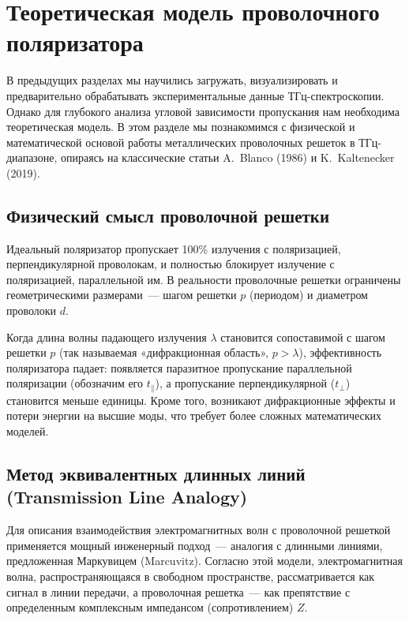 
\section{Теоретическая модель проволочного поляризатора}\label{sec:theory}

В предыдущих разделах мы научились загружать, визуализировать и предварительно обрабатывать экспериментальные данные ТГц-спектроскопии. Однако для глубокого анализа угловой зависимости пропускания нам необходима теоретическая модель. В этом разделе мы познакомимся с физической и математической основой работы металлических проволочных решеток в ТГц-диапазоне, опираясь на классические статьи A.~Blanco (1986) и K.~Kaltenecker (2019).

\subsection{Физический смысл проволочной решетки}

Идеальный поляризатор пропускает 100\% излучения с поляризацией, перпендикулярной проволокам, и полностью блокирует излучение с поляризацией, параллельной им. В реальности проволочные решетки ограничены геометрическими размерами~--- шагом решетки $p$ (периодом) и диаметром проволоки $d$. 

Когда длина волны падающего излучения $\lambda$ становится сопоставимой с шагом решетки $p$ (так называемая «дифракционная область», $p > \lambda$), эффективность поляризатора падает: появляется паразитное пропускание параллельной поляризации (обозначим его $t_\parallel$), а пропускание перпендикулярной ($t_\perp$) становится меньше единицы. Кроме того, возникают дифракционные эффекты и потери энергии на высшие моды, что требует более сложных математических моделей.

\subsection{Метод эквивалентных длинных линий (Transmission Line Analogy)}

Для описания взаимодействия электромагнитных волн с проволочной решеткой применяется мощный инженерный подход~--- аналогия с длинными линиями, предложенная Маркувицем (Marcuvitz). Согласно этой модели, электромагнитная волна, распространяющаяся в свободном пространстве, рассматривается как сигнал в линии передачи, а проволочная решетка~--- как препятствие с определенным комплексным импедансом (сопротивлением) $Z$.

